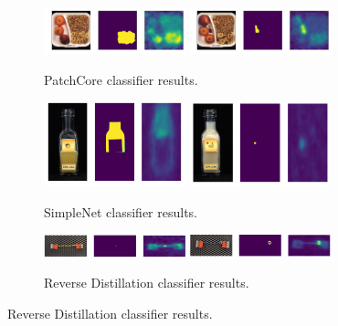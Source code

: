 \begin{figure}[H]
    \captionsetup[subfigure]{justification=centering}
    \centering
    \begin{subfigure}[b]{\textwidth}
        \centering
        \includegraphics[width=0.45\textwidth]{figures/locoallapproaches/patchcore/breakfast_box_test_logical_anomalies_003.png}
        \includegraphics[width=0.45\textwidth]{figures/locoallapproaches/patchcore/breakfast_box_test_structural_anomalies_014.png}
        \caption{PatchCore \cite{patchCore2022} classifier results.}

    \end{subfigure}
    \begin{subfigure}[b]{\textwidth}
        \centering
        \includegraphics[width=0.45\textwidth]{figures/locoallapproaches/simplenet/image_prediction_188.png}
        \includegraphics[width=0.45\textwidth]{figures/locoallapproaches/simplenet/image_prediction_258.png}
        \caption{SimpleNet \cite{liu2023simplenet} classifier results.}

    \end{subfigure}
    \begin{subfigure}[b]{\textwidth}
        \centering
        \includegraphics[width=0.45\textwidth]{figures/locoallapproaches/RevDist/revdist_003.png}
        \includegraphics[width=0.45\textwidth]{figures/locoallapproaches/RevDist/RevDist_053.png}
        \caption{Reverse Distillation \cite{revdist2023} classifier results.}


\end{subfigure}
\end{figure}
